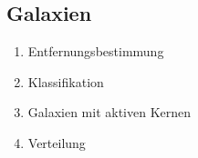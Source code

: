 \documentclass[a4paper,9pt]{article}
\begin{document}
\begin{multicols}{3}
    \section{Galaxien} %
    \label{sec:galaxien}
      \begin{enumerate}
        \item Entfernungsbestimmung
        \item Klassifikation
        \item Galaxien mit aktiven Kernen
        \item Verteilung
      \end{enumerate}
  \end{multicols}
\end{document}
